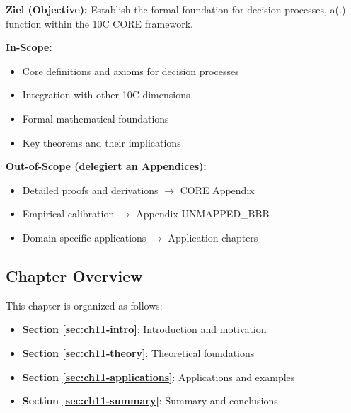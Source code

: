 \begin{tcolorbox}[
    colback=purple!5!white,
    colframe=purple!75!black,
    title={\textbf{Chapter Scope: Ziel / In-Scope / Out-of-Scope}},
    fonttitle=\bfseries
]

\textbf{Ziel (Objective):}
Establish the formal foundation for decision processes, a(.) function within the 10C CORE framework.

\vspace{0.3cm}
\textbf{In-Scope:}
\begin{itemize}[nosep]
    \item Core definitions and axioms for decision processes
    \item Integration with other 10C dimensions
    \item Formal mathematical foundations
    \item Key theorems and their implications
\end{itemize}

\vspace{0.3cm}
\textbf{Out-of-Scope (delegiert an Appendices):}
\begin{itemize}[nosep]
    \item Detailed proofs and derivations $\rightarrow$ CORE Appendix
    \item Empirical calibration $\rightarrow$ Appendix UNMAPPED_BBB
    \item Domain-specific applications $\rightarrow$ Application chapters
\end{itemize}

\end{tcolorbox}



\subsection*{Chapter Overview}

This chapter is organized as follows:

\begin{itemize}
\item \textbf{Section \ref{sec:ch11-intro}}: Introduction and motivation
\item \textbf{Section \ref{sec:ch11-theory}}: Theoretical foundations
\item \textbf{Section \ref{sec:ch11-applications}}: Applications and examples
\item \textbf{Section \ref{sec:ch11-summary}}: Summary and conclusions
\end{itemize}



